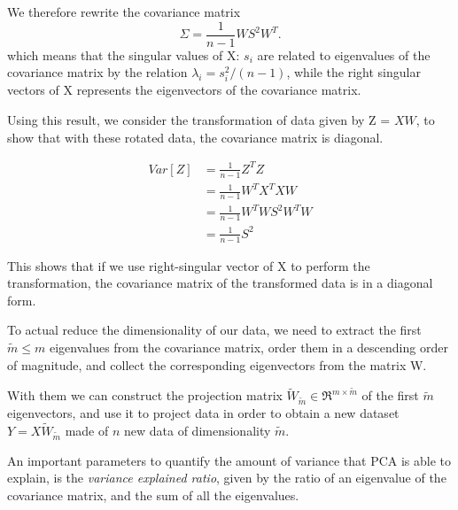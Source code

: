 \documentclass[11pt]{report}
\begin{document}
We therefore rewrite the covariance matrix
\begin{equation}
\Sigma = \frac{1}{n-1}W S^2 W^T.
\end{equation}
which means that the singular values of X: $s_i$ are related to eigenvalues of the covariance matrix by the relation $\lambda_i = s_i^2/(n-1)$, while the right singular vectors of X represents the eigenvectors of the covariance matrix.

Using this result, we consider the transformation of data given by Z = $X W$, to show that with these rotated data, the covariance matrix is diagonal.

\begin{equation}
\begin{aligned}
Var[Z] & = \frac{1}{n-1}Z^T Z \\
 & =\frac{1}{n-1} W^T X^T X W   \\
 & = \frac{1}{n-1} W^T W S^2 W^T W \\
 & = \frac{1}{n-1}S^2
\end{aligned}
\end{equation}

This shows that if we use right-singular vector of X to perform the transformation, the covariance matrix of the transformed data is in a diagonal form.

To actual reduce the dimensionality of our data, we need to extract the first $\tilde m \leq m$ eigenvalues from the covariance matrix, order them in a descending order of magnitude, and collect the corresponding eigenvectors from the matrix W.

With them we can construct the projection matrix $\tilde W_{\tilde m} \in \Re^{m \times \tilde m}$ of the first $\tilde m$ eigenvectors, and use it to project data in order to obtain a new dataset $Y = X \tilde W_{\tilde m}$ made of $n$ new data of dimensionality $\tilde m$.
\hfill

\noindent An important parameters to quantify the amount of variance that PCA is able to explain, is the \emph{variance explained ratio}, given by the ratio of an eigenvalue of the covariance matrix, and the sum of all the eigenvalues.
\end{document}
